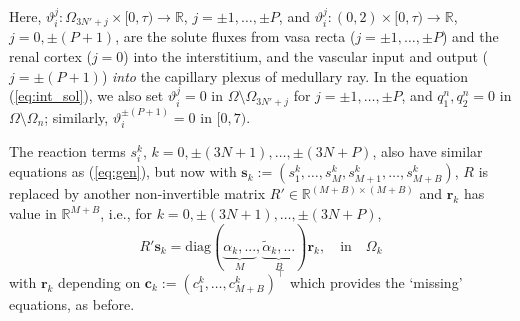 \documentclass{article}
\begin{document}
Here, $\vartheta_i^j:\Omega_{3N'+j}\times [0,\tau)\to \mathbb{R}$, $j=\pm 1,\dots,\pm P$, and $\vartheta_i^j:(0,2)\times [0,\tau)\to \mathbb{R}$, $j=0,\pm(P+1)$, are the solute fluxes from vasa recta ($j=\pm 1,\dots,\pm P$) and the renal cortex ($j=0$) into the interstitium, and the vascular input and output ($j=\pm(P+1)$) \textit{into} the capillary plexus of medullary ray.
In the equation (\ref{eq:int_sol}), we also set $\vartheta_i^j=0$ in $\Omega\setminus \Omega_{3N'+j}$ for $j=\pm 1,\dots,\pm P$, and $q_1^n,q_2^n=0$ in $\Omega\setminus\Omega_n$; similarly, $\vartheta_i^{\pm(P+1)} = 0$ in $[0,7)$.

The reaction terms $s_i^k$, $k=0,\pm(3N+1),\dots,\pm(3N+P)$, also have similar equations as (\ref{eq:gen}), but now with $\mathbf{s}_k:=(s_1^k,\dots,s_M^k,s_{M+1}^k,\dots,s_{M+B}^k)$, $R$ is replaced by another non-invertible matrix $R'\in \mathbb{R}^{(M+B)\times (M+B)}$ and $\mathbf{r}_k$ has value in $\mathbb{R}^{M+B}$, i.e., for $k=0,\pm(3N+1),\dots,\pm(3N+P)$,
\begin{equation}
    R'\mathbf{s}_k=\mathrm{diag}(\underbrace{\alpha_k,...}_{M},\underbrace{\tilde{\alpha}_k,\dots}_B)\mathbf{r}_k,\quad \text{in}\quad \Omega_k
\end{equation}
with $\mathbf{r}_k$ depending on $\mathbf{c}_k:=(c_1^k,\dots,c_{M+B}^k)^\top$ which provides the `missing' equations, as before.
\end{document}
